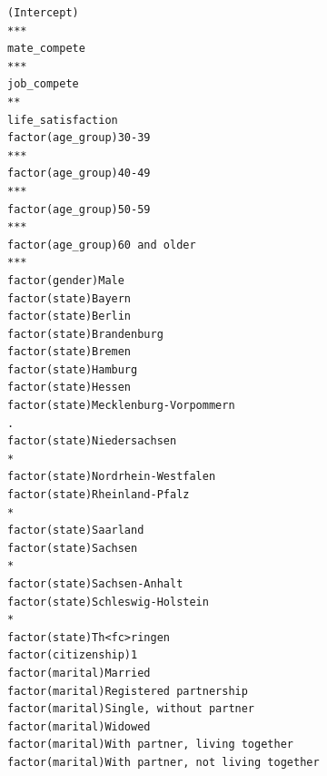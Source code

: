 \documentclass[
]{article}
\begin{document}
\begin{table}
\begin{minipage}[t]{\linewidth}
{\begin{verbatim}
(Intercept)                                                                       ***
mate_compete                                                                      ***
job_compete                                                                       ** 
life_satisfaction                                                                    
factor(age_group)30-39                                                            ***
factor(age_group)40-49                                                            ***
factor(age_group)50-59                                                            ***
factor(age_group)60 and older                                                     ***
factor(gender)Male                                                                   
factor(state)Bayern                                                                  
factor(state)Berlin                                                                  
factor(state)Brandenburg                                                             
factor(state)Bremen                                                                  
factor(state)Hamburg                                                                 
factor(state)Hessen                                                                  
factor(state)Mecklenburg-Vorpommern                                               .  
factor(state)Niedersachsen                                                        *  
factor(state)Nordrhein-Westfalen                                                     
factor(state)Rheinland-Pfalz                                                      *  
factor(state)Saarland                                                                
factor(state)Sachsen                                                              *  
factor(state)Sachsen-Anhalt                                                          
factor(state)Schleswig-Holstein                                                   *  
factor(state)Th<fc>ringen                                                            
factor(citizenship)1                                                                 
factor(marital)Married                                                               
factor(marital)Registered partnership                                                
factor(marital)Single, without partner                                               
factor(marital)Widowed                                                               
factor(marital)With partner, living together                                         
factor(marital)With partner, not living together                                     

\end{verbatim}}
\end{minipage}
\end{table}
\end{document}
